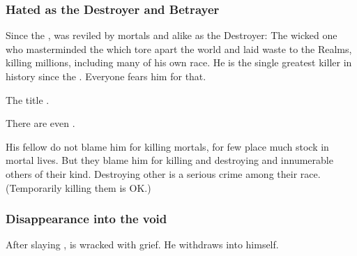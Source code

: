 




\subsubsection{Hated as the Destroyer and Betrayer}
Since the \SecondShrouding, \Ishnaruchaefir{} was reviled by mortals and \resphain{} alike as the Destroyer: 
The wicked one who masterminded the \SecondShrouding{} which tore apart the world and laid waste to the Realms, killing millions, including many of his own race. 
He is the single greatest killer in history since the \firstbanewar. 
Everyone fears him for that. 

The title .

There are even . 

His fellow \dragons{} do not blame him for killing mortals, for few \dragons{} place much stock in mortal lives. 
But they blame him for killing and destroying \Rystessakhin{} and innumerable others of their kind. 
Destroying other \dragons{} is a serious crime among their race. 
(Temporarily killing them is OK.)








\subsubsection{Disappearance into the void}
After slaying \Triestessakhin, \Ishnaruchaefir{} is wracked with grief. 
He withdraws into himself. 

